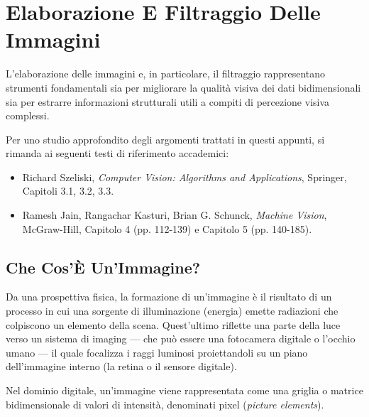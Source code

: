 ﻿\documentclass[11pt, a4paper]{article}
\author{Francesco Lo Verde}
\begin{document}

\section{Elaborazione E Filtraggio Delle Immagini}

L'elaborazione delle immagini e, in particolare, il filtraggio rappresentano strumenti fondamentali sia per migliorare la qualità visiva dei dati bidimensionali sia per estrarre informazioni strutturali utili a compiti di percezione visiva complessi.


Per uno studio approfondito degli argomenti trattati in questi appunti, si rimanda ai seguenti testi di riferimento accademici:
\begin{itemize}
    \item Richard Szeliski, \emph{Computer Vision: Algorithms and Applications}, Springer, Capitoli 3.1, 3.2, 3.3.
    \item Ramesh Jain, Rangachar Kasturi, Brian G. Schunck, \emph{Machine Vision}, McGraw-Hill, Capitolo 4 (pp. 112-139) e Capitolo 5 (pp. 140-185).
\end{itemize}

\subsection{Che Cos'È Un'Immagine?}

Da una prospettiva fisica, la formazione di un'immagine è il risultato di un processo in cui una sorgente di illuminazione (energia) emette radiazioni che colpiscono un elemento della scena. Quest'ultimo riflette una parte della luce verso un sistema di imaging — che può essere una fotocamera digitale o l'occhio umano — il quale focalizza i raggi luminosi proiettandoli su un piano dell'immagine interno (la retina o il sensore digitale).


Nel dominio digitale, un'immagine viene rappresentata come una griglia o matrice bidimensionale di valori di intensità, denominati pixel (\emph{picture elements}).
\end{document}
